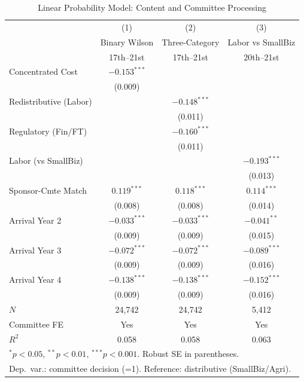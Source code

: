 \documentclass[11pt]{article}
\begin{document}
\begin{table}[H]
\centering
\caption{Linear Probability Model: Content and Committee Processing}
\label{tab:main}
\begin{tabular}{lccc}
\toprule
 & (1) & (2) & (3) \\
 & Binary Wilson & Three-Category & Labor vs SmallBiz \\
 & 17th--21st & 17th--21st & 20th--21st \\
\midrule
Concentrated Cost & $-0.153^{***}$ &  &  \\
                  & (0.009) &  &  \\[4pt]
Redistributive (Labor) &  & $-0.148^{***}$ &  \\
                       &  & (0.011) &  \\[4pt]
Regulatory (Fin/FT) &  & $-0.160^{***}$ &  \\
                     &  & (0.011) &  \\[4pt]
Labor (vs SmallBiz) &  &  & $-0.193^{***}$ \\
                    &  &  & (0.013) \\[4pt]
Sponsor-Cmte Match & $0.119^{***}$ & $0.118^{***}$ & $0.114^{***}$ \\
                   & (0.008) & (0.008) & (0.014) \\[4pt]
Arrival Year 2 & $-0.033^{***}$ & $-0.033^{***}$ & $-0.041^{**}$ \\
               & (0.009) & (0.009) & (0.015) \\[4pt]
Arrival Year 3 & $-0.072^{***}$ & $-0.072^{***}$ & $-0.089^{***}$ \\
               & (0.009) & (0.009) & (0.016) \\[4pt]
Arrival Year 4 & $-0.138^{***}$ & $-0.138^{***}$ & $-0.152^{***}$ \\
               & (0.009) & (0.009) & (0.016) \\
\midrule
$N$ & 24,742 & 24,742 & 5,412 \\
Committee FE & Yes & Yes & Yes \\
$R^2$ & 0.058 & 0.058 & 0.063 \\
\bottomrule
\multicolumn{4}{l}{\footnotesize $^{*}p<0.05$, $^{**}p<0.01$, $^{***}p<0.001$. Robust SE in parentheses.} \\
\multicolumn{4}{l}{\footnotesize Dep.\ var.: committee decision (=1). Reference: distributive (SmallBiz/Agri).} \\
\end{tabular}
\end{table}
\end{document}
